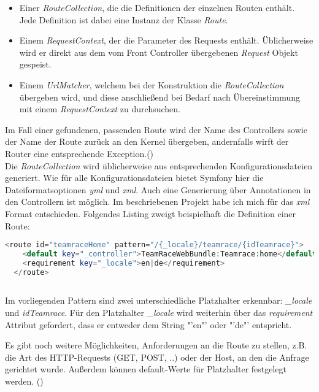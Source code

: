\documentclass[12pt]{report}
\begin{document}
\begin{itemize}
\item{Einer \emph{RouteCollection}, die die Definitionen der einzelnen Routen enthält. Jede Definition ist dabei eine Instanz der Klasse \emph{Route}}.
\item{Einem \emph{RequestContext}, der die Parameter des Requests enthält. Üblicherweise wird er direkt aus dem vom Front Controller übergebenen \emph{Request} Objekt gespeist.}
\item{Einem \emph{UrlMatcher}, welchem bei der Konstruktion die \emph{RouteCollection} übergeben wird, und diese anschließend bei Bedarf nach Übereinstimmung mit einem \emph{RequestContext} zu durchsuchen.}
\end{itemize}

Im Fall einer gefundenen, passenden Route wird der Name des Controllers sowie der Name der Route zurück an den Kernel übergeben, andernfalls wirft der Router eine entsprechende Exception.(\cite{sf2:RoutingComponent})\\

Die \emph{RouteCollection} wird üblicherweise aus entsprechenden Konfigurationsdateien generiert. Wie für alle Konfigurationsdateien bietet Symfony hier die Dateiformatsoptionen \emph{yml} und \emph{xml}. Auch eine Generierung über Annotationen in den Controllern ist möglich. Im beschriebenen Projekt habe ich mich für das \emph{xml} Format entschieden. Folgendes Listing zweigt beispielhaft die Definition einer Route:

\begin{lstlisting}[language=PHP, caption=Auszug aus\\ src/TeamRace/WebBundle/Resources/config/routing.xml]
  <route id="teamraceHome" pattern="/{_locale}/teamrace/{idTeamrace}">
    <default key="_controller">TeamRaceWebBundle:Teamrace:home</default>
    <requirement key="_locale">en|de</requirement>
  </route>
  
\end{lstlisting}
  
Im vorliegenden Pattern sind zwei unterschiedliche Platzhalter erkennbar: \emph{\_locale} und \emph{idTeamrace}. Für den Platzhalter \emph{\_locale} wird weiterhin über das \emph{requirement} Attribut gefordert, dass er entweder dem String "'en"' oder "'de"' entspricht.

Es gibt noch weitere Möglichkeiten, Anforderungen an die Route zu stellen, z.B. die Art des HTTP-Requests (GET, POST, ..) oder der Host, an den die Anfrage gerichtet wurde. Außerdem können default-Werte für Platzhalter festgelegt werden. (\cite{sf2:Routing})\\
\end{document}

